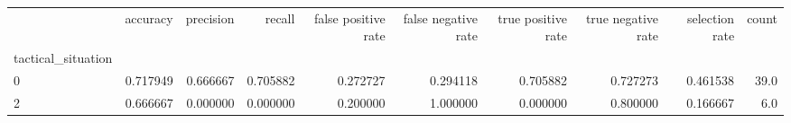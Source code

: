 \begin{tabular}{lrrrrrrrrr}
\toprule
{} &  accuracy &  precision &    recall &  false positive rate &  false negative rate &  true positive rate &  true negative rate &  selection rate &  count \\
tactical\_situation &           &            &           &                      &                      &                     &                     &                 &        \\
\midrule
0                  &  0.717949 &   0.666667 &  0.705882 &             0.272727 &             0.294118 &            0.705882 &            0.727273 &        0.461538 &   39.0 \\
2                  &  0.666667 &   0.000000 &  0.000000 &             0.200000 &             1.000000 &            0.000000 &            0.800000 &        0.166667 &    6.0 \\
\bottomrule
\end{tabular}
